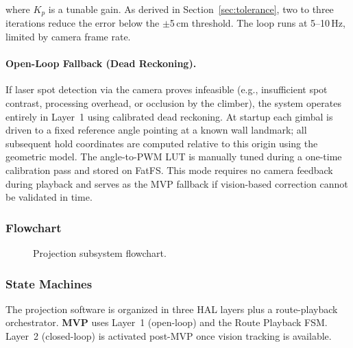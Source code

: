 \documentclass[12pt]{extarticle}
\begin{document}
where $K_p$ is a tunable gain. As derived in Section~\ref{sec:tolerance}, two to three
iterations reduce the error below the $\pm$5\,cm threshold. The loop runs at 5--10\,Hz,
limited by camera frame rate.

\paragraph{Open-Loop Fallback (Dead Reckoning).}
If laser spot detection via the camera proves infeasible (e.g., insufficient spot contrast,
processing overhead, or occlusion by the climber), the system operates entirely in Layer~1
using calibrated dead reckoning. At startup each gimbal is driven to a fixed reference angle
pointing at a known wall landmark; all subsequent hold coordinates are computed relative to
this origin using the geometric model. The angle-to-PWM LUT is manually tuned during a
one-time calibration pass and stored on FatFS. This mode requires no camera feedback during
playback and serves as the MVP fallback if vision-based correction cannot be validated in
time.


\subsubsection{Flowchart}

\begin{figure}[H]
\centering
{}
\caption{Projection subsystem flowchart.}
\label{fig:flow-projection}
\end{figure}

\subsubsection{State Machines}

The projection software is organized in three HAL layers plus a route-playback orchestrator.
\textbf{MVP} uses Layer~1 (open-loop) and the Route Playback FSM.
Layer~2 (closed-loop) is activated post-MVP once vision tracking is available.
\end{document}

